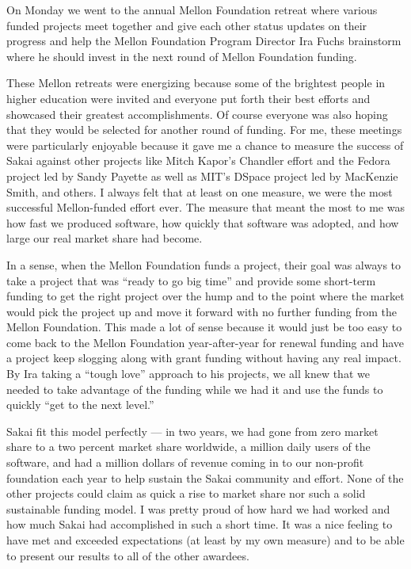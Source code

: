 \documentclass[12pt]{book}
\begin{document}
On Monday we went to the annual Mellon Foundation
retreat where various funded projects
meet together
and give each other status updates on their progress
and help the Mellon Foundation Program Director Ira
Fuchs brainstorm where he should invest in the next
round of Mellon Foundation funding.

These Mellon retreats were energizing because some
of the brightest people in higher education were invited
and everyone put forth their best efforts and showcased
their greatest accomplishments. Of course everyone was
also hoping that they would be selected for another
round of funding.   For me, these meetings were
particularly enjoyable because it gave me a chance
to measure the success of Sakai against other projects
like Mitch Kapor's Chandler effort and the Fedora
project led by Sandy Payette as well as
MIT's DSpace project led by MacKenzie Smith,
and others.  I always felt that at least on one
measure, we were the most successful Mellon-funded
effort ever.  The measure that meant the most to me
was how fast we produced software, how quickly that
software was adopted, and how large our real market
share had become.

In a sense, when the Mellon Foundation funds a project,
their goal was always to take a project that was
``ready to go big time'' and provide some short-term
funding to get the right project over the hump and
to the point where the market would pick the project
up and move it forward with no further funding from
the Mellon Foundation.   This made a lot of sense
because it would just be too easy to come back to
the Mellon Foundation year-after-year for renewal funding
and have a project keep slogging along with grant
funding without having any real impact.  By Ira taking
a ``tough love'' approach to his projects, we all knew
that we needed to take advantage of the funding while
we had it and use the funds to quickly ``get to the next level.''

Sakai fit this model perfectly --- in two years, we had
gone from zero market share to a two percent market share
worldwide, a million daily users of the software, and
had a million dollars of revenue coming in to our
non-profit foundation each year to help sustain the
Sakai community and effort.   None of the other projects
could claim as quick a rise to market share nor such a
solid sustainable funding model.  I was pretty proud of
how hard we had worked and how much Sakai had accomplished
in such a short time.   It was a nice feeling to have
met and exceeded expectations (at least by my own
measure) and to be able to present our results to all of
the other awardees.
\end{document}
